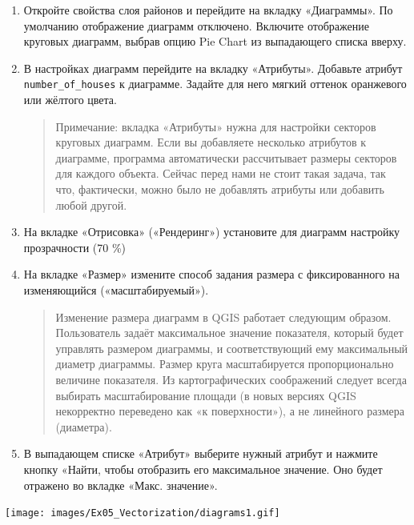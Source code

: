 \documentclass[
  12pt,
]{book}
\begin{document}
\begin{enumerate}
\def\labelenumi{\arabic{enumi}.}
\item
  Откройте свойства слоя районов и перейдите на вкладку «Диаграммы». По умолчанию отображение диаграмм отключено. Включите отображение круговых диаграмм, выбрав опцию Pie Chart из выпадающего списка вверху.
\item
  В настройках диаграмм перейдите на вкладку «Атрибуты». Добавьте атрибут \texttt{number\_of\_houses} к диаграмме. Задайте для него мягкий оттенок оранжевого или жёлтого цвета.

  \begin{quote}
  Примечание: вкладка «Атрибуты» нужна для настройки секторов круговых диаграмм. Если вы добавляете несколько атрибутов к диаграмме, программа автоматически рассчитывает размеры секторов для каждого объекта. Сейчас перед нами не стоит такая задача, так что, фактически, можно было не добавлять атрибуты или добавить любой другой.
  \end{quote}
\item
  На вкладке «Отрисовка» («Рендеринг») установите для диаграмм настройку прозрачности (70 \%)
\item
  На вкладке «Размер» измените способ задания размера с фиксированного на изменяющийся («масштабируемый»).

  \begin{quote}
  Изменение размера диаграмм в QGIS работает следующим образом. Пользователь задаёт максимальное значение показателя, который будет управлять размером диаграммы, и соответствующий ему максимальный диаметр диаграммы. Размер круга масштабируется пропорционально величине показателя. Из картографических соображений следует всегда выбирать масштабирование площади (в новых версиях QGIS некорректно переведено как «к поверхности»), а не линейного размера (диаметра).
  \end{quote}
\item
  В выпадающем списке «Атрибут» выберите нужный атрибут и нажмите кнопку «Найти, чтобы отобразить его максимальное значение. Оно будет отражено во вкладке «Макс. значение».
\end{enumerate}

\texttt{[image: images/Ex05\_Vectorization/diagrams1.gif]}
\end{document}
